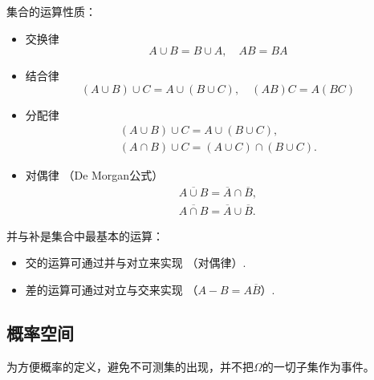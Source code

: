 \begin{property}
    集合的运算性质：
    \begin{itemize}
        \item 交换律
              \begin{equation}\label{eq:commutativity_set}
                  A \cup B = B \cup A, \quad AB = BA
              \end{equation}
        \item 结合律
              \begin{equation}
                  (A \cup B) \cup C = A \cup(B \cup C), \quad (AB)C = A(BC)\label{eq:associative_law_set}
              \end{equation}
        \item 分配律
              \begin{gather}
                  (A \cup B) \cup C = A \cup(B \cup C),\label{eq:distributive_law_set1}\\
                  (A \cap B) \cup C = (A \cup C) \cap(B \cup C).\label{eq:distributive_law_set2}
              \end{gather}
        \item 对偶律 （De Morgan公式）
              \begin{gather}
                  \overline{A \cup B} = \overline{A} \cap \overline{B},\label{eq:DeMorgan_law_set1}\\
                  \overline{A \cap B} = \overline{A} \cup \overline{B}.\label{eq:DeMorgan_law_set2}
              \end{gather}
    \end{itemize}
\end{property}


\begin{remark}
    并与补是集合中最基本的运算：
    \begin{itemize}
        \item 交的运算可通过并与对立来实现 （对偶律）.
        \item 差的运算可通过对立与交来实现 （$A - B = A\overline{B}$）.
    \end{itemize}
\end{remark}

\subsection{概率空间}

为方便概率的定义，避免不可测集的出现，并不把$\Omega$的一切子集作为事件。

